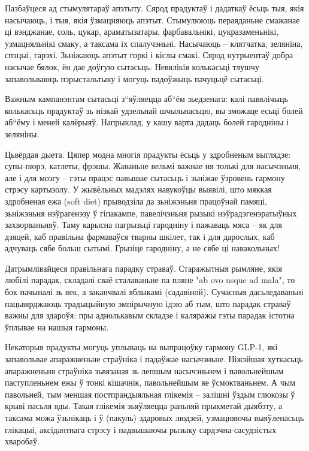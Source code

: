 Пазбаўцеся ад стымулятараў апэтыту. Сярод прадуктаў і дадаткаў ёсьць тыя, якія насычаюць, і тыя, якія ўзмацняюць апэтыт. Стымулююць пераяданьне смажанае ці вэнджанае, соль, цукар, араматызатары, фарбавальнікі, цукразаменьнікі, узмацняльнікі смаку, а таксама іх спалучэньні. Насычаюць – клятчатка, зеляніна, спэцыі, гарэхі. Зьніжаюць апэтыт горкі і кіслы смакі. Сярод нутрыентаў добра насычае бялок, ён дае доўгую сытасьць. Невялікія колькасьці тлушчу запавольваюць пэрыстальтыку і могуць падоўжыць пачуцьцё сытасьці.

Важным кампанэнтам сытасьці з“яўляецца аб“ём зьедзенага: калі павялічыць колькасьць прадуктаў зь нізкай удзельнай шчыльнасьцю, вы зможаце есьці болей аб“ёму і меней калёрыяў. Напрыклад, у кашу варта дадаць болей гародніны і зеляніны.

Цьвёрдая дыета. Цяпер модна многія прадукты ёсьць у здробненым выглядзе: супы-пюрэ, катлеты, фрэшы. Жаваньне вельмі важнае ня толькі для насычэньня, але і для мозгу – гэты працэс павышае сытасьць і зьніжае ўзровень гармону стрэсу картызолу. У жывёльных мадэлях навукоўцы выявілі, што мяккая здробненая ежа (soft diet) прыводзіла да зьніжэньня працоўнай памяці, зьніжэньня нэўрагенэзу ў гіпакампе, павелічэньня рызыкі нэўрадэгенэратыўных захворваньняў. Таму карысна пагрызьці гародніну і пажаваць мяса – як для дзяцей, каб правільна фармаваўся тварны шкілет, так і для дарослых, каб адчуваць сябе больш сытымі. Грызіце гародніну, а не сябе ці навакольных!

Датрымлівайцеся правільнага парадку страваў. Старажытныя рымляне, якія любілі парадак, складалі сваё сталаваньне па пляне "ab ovo usque ad mala", то бок пачыналі зь яек, а заканчвалі яблыкамі (садавіной). Сучасныя дасьледаваньні пацьвярджаюць традыцыйную эмпірычную ідэю аб тым, што парадак страваў важны для здароўя: пры аднолькавым складзе і каляражы гэты парадак істотна ўплывае на нашыя гармоны.

Некаторыя прадукты могуць уплываць на выпрацоўку гармону GLP-1, які запавольвае апаражненьне страўніка і падаўжае насычэньне. Ніжэйшая хуткасьць апаражненьня страўніка зьвязаная зь лепшым насычэньнем і павольнейшым паступленьнем ежы ў тонкі кішачнік, павольнейшым яе ўсмоктваньнем. А чым павольней, тым меншая постпрандыяльная глікемія – залішні ўздым глюкозы ў крыві пасьля яды. Такая глікемія зьяўляецца раньняй прыкметай дыябэту, а таксама можа ўзьнікаць і ў (пакуль) здаровых людзей, узмацняючы выяўленасьць глікацыі, аксідантнага стрэсу і падвышаючы рызыку сардэчна-сасудзістых хваробаў.

